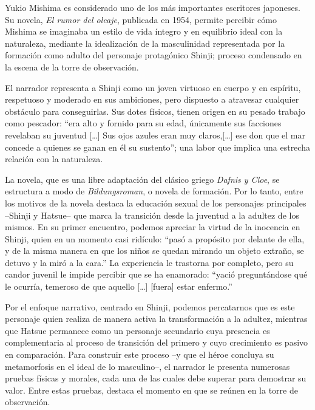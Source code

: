 Yukio Mishima es considerado uno de los más importantes escritores japoneses.
Su novela, \emph{El rumor del oleaje}, publicada en 1954, permite percibir cómo Mishima se imaginaba un estilo de vida íntegro y en equilibrio ideal con la naturaleza, mediante la idealización de la masculinidad representada por la formación como adulto del personaje protagónico Shinji; proceso condensado en la escena de la torre de observación.

El narrador representa a Shinji como un joven virtuoso en cuerpo y en espíritu, respetuoso y moderado en sus ambiciones, pero dispuesto a atravesar cualquier obstáculo para conseguirlas. Sus dotes físicos, tienen origen en su pesado trabajo como pescador: ``era alto y fornido para su edad, únicamente sus facciones revelaban su juventud [\ldots] Sus ojos azules eran muy claros,[\ldots] ese don que el mar concede a quienes se ganan en él su sustento''\autocite{mishima2006}; una labor que implica una estrecha relación con la naturaleza.

La novela, que es una libre adaptación del clásico griego \emph{Dafnis y Cloe}, se estructura a modo de \emph{Bildungsroman}, o novela de formación.
Por lo tanto, entre los motivos de la novela destaca la educación sexual de los personajes principales --Shinji y Hatsue-- que marca la transición desde la juventud a la adultez de los mismos.
En su primer encuentro, podemos apreciar la virtud de la inocencia en Shinji, quien en un momento casi ridículo: ``pasó a propósito por delante de ella, y de la misma manera en que los niños se quedan mirando un objeto extraño, se detuvo y la miró a la cara.''\autocite{mishima2006}
La experiencia le trastorna por completo, pero su candor juvenil le impide percibir que se ha enamorado: ``yació preguntándose qué le ocurría, temeroso de que aquello [\ldots] [fuera] estar enfermo.''\autocite{mishima2006}

Por el enfoque narrativo, centrado en Shinji, podemos percatarnos que es este personaje quien realiza de manera activa la transformación a la adultez, mientras que Hatsue permanece como un personaje secundario cuya presencia es complementaria al proceso de transición del primero y cuyo crecimiento es pasivo en comparación.
Para construir este proceso --y que el héroe concluya su metamorfosis en el ideal de lo masculino--, el narrador le presenta numerosas pruebas físicas y morales, cada una de las cuales debe superar para demostrar su valor. Entre estas pruebas, destaca el momento en que se reúnen en la torre de observación. 

